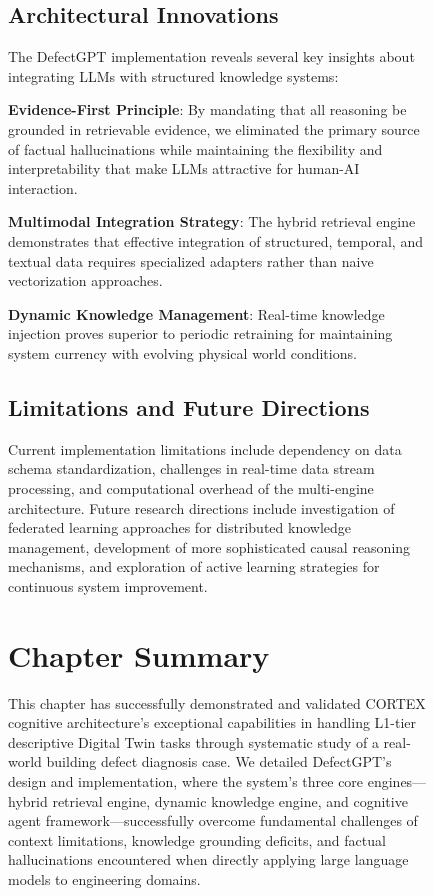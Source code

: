 \begin{figure}[htbp]
\subsection{Architectural Innovations}

The DefectGPT implementation reveals several key insights about integrating LLMs with structured knowledge systems:

\textbf{Evidence-First Principle}: By mandating that all reasoning be grounded in retrievable evidence, we eliminated the primary source of factual hallucinations while maintaining the flexibility and interpretability that make LLMs attractive for human-AI interaction.

\textbf{Multimodal Integration Strategy}: The hybrid retrieval engine demonstrates that effective integration of structured, temporal, and textual data requires specialized adapters rather than naive vectorization approaches.

\textbf{Dynamic Knowledge Management}: Real-time knowledge injection proves superior to periodic retraining for maintaining system currency with evolving physical world conditions.

\subsection{Limitations and Future Directions}

Current implementation limitations include dependency on data schema standardization, challenges in real-time data stream processing, and computational overhead of the multi-engine architecture. Future research directions include investigation of federated learning approaches for distributed knowledge management, development of more sophisticated causal reasoning mechanisms, and exploration of active learning strategies for continuous system improvement.

\section{Chapter Summary}

This chapter has successfully demonstrated and validated CORTEX cognitive architecture's exceptional capabilities in handling L1-tier descriptive Digital Twin tasks through systematic study of a real-world building defect diagnosis case. We detailed DefectGPT's design and implementation, where the system's three core engines—hybrid retrieval engine, dynamic knowledge engine, and cognitive agent framework—successfully overcome fundamental challenges of context limitations, knowledge grounding deficits, and factual hallucinations encountered when directly applying large language models to engineering domains.


\end{figure}
